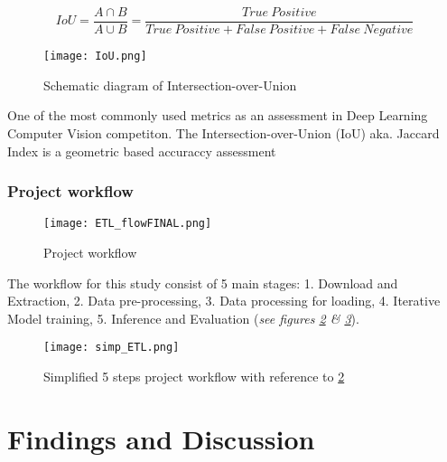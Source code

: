 \documentclass[11pt, a4paper, twoside]{report}
\begin{document}
\begin{equation}
  IoU = \frac{A \cap B}{A \cup B} = \frac{True\ Positive}{True\ Positive + False\ Positive + False\ Negative}
\end{equation}

\begin{figure}[H]
  \centering
  \texttt{[image: IoU.png]}
  \caption{Schematic diagram of Intersection-over-Union}
  \label{fig:IoU}
\end{figure}


One of the most commonly used metrics as an assessment in Deep Learning Computer Vision competiton. The Intersection-over-Union (IoU) aka. Jaccard Index is a geometric based accuraccy assessment\\\par

\subsection{Project workflow}\label{ProjWorkflow}

\begin{figure}[H]
  \centering
  \texttt{[image: ETL\_flowFINAL.png]}
  \caption{Project workflow}
  \label{fig:ETL_flow}
\end{figure}

The workflow for this study consist of 5 main stages: 1. Download and Extraction, 2. Data pre-processing, 3. Data processing for loading, 4. Iterative Model training, 5. Inference and Evaluation (\textit{see figures \ref{fig:ETL_flow} \& \ref{fig:simp_ETL}}).

\begin{figure}[H]
  \centering
  \texttt{[image: simp\_ETL.png]}
  \caption{Simplified 5 steps project workflow with reference to \ref{fig:ETL_flow}}
  \label{fig:simp_ETL}
\end{figure}

\newpage

\chapter{Findings and Discussion}\label{findings}
\end{document}
